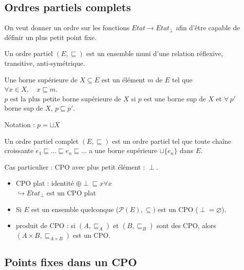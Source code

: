 \documentclass[10pt,a4paper]{article}
\begin{document}
\subsection{Ordres partiels complets}
On veut donner un ordre sur les fonctions $Etat \rightarrow Etat_{\perp}$ afin d'être capable de définir un plus petit point fixe.
\begin{definition}
 Un ordre partiel $(E,\sqsubseteq)$ est un ensemble muni d'une relation réflexive, transitive, anti-symétrique.
\end{definition}
\begin{definition}
 Une borne supérieure de $X \subseteq E$ est un élément $m$ de $E$ tel que \\
\indent $\forall x \in X, \quad x \sqsubseteq m$.\\
$p$ est la plus petite borne supérieure de $X$ si $p$ est une borne sup de $X$ et $\forall \: p'$ borne sup de $X$, $p \sqsubseteq p'$.

Notation : $p = \sqcup X$
\end{definition}
\begin{definition}
 Un ordre partiel complet $(E,\sqsubseteq)$ est un ordre partiel tel que toute chaîne croissante $e_1 \sqsubseteq \dots \sqsubseteq e_n \sqsubseteq \dots $ a une borne supérieure $\sqcup \{ e_n \}$ dans $E$.

 Cas particulier : CPO avec plus petit élément : $\perp$.
\end{definition}
\begin{exs}[de CPO :]
 \begin{itemize}
  \item CPO plat : identité $\oplus \perp \sqsubseteq x \forall x$ 
  \\ $\hookrightarrow Etat_{\perp}$ est un CPO plat
  \item Si $E$ est un ensemble quelconque ($\mathcal{P}(E), \subseteq)$ est un CPO ($\perp = \varnothing $).
  \item produit de CPO : si $(A, \sqsubseteq_A)$ et $(B, \sqsubseteq_B)$ sont des CPO, alors $(A\times B, \sqsubseteq_{A\times B})$ est un CPO.
 \end{itemize}

\end{exs}



\subsection{Points fixes dans un CPO}
\end{document}
